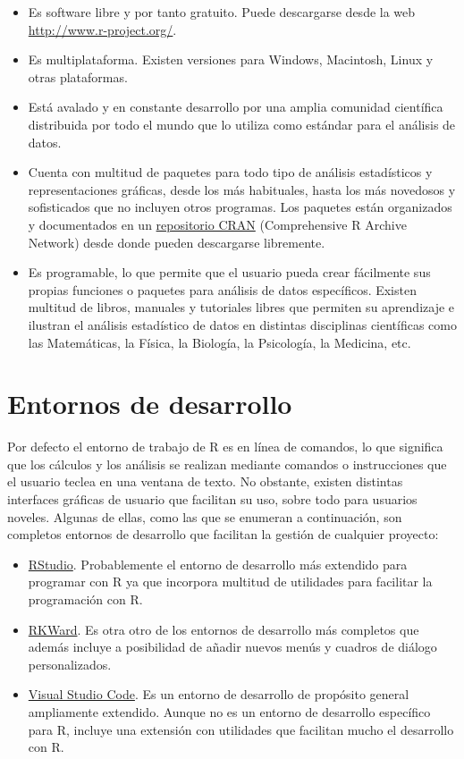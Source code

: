 \documentclass[
]{book}
\providecommand{\tightlist}{%
  \setlength{\itemsep}{0pt}\setlength{\parskip}{0pt}}
\theoremstyle{definition}
\theoremstyle{definition}
\theoremstyle{definition}
\theoremstyle{definition}
\theoremstyle{remark}
\begin{document}
\begin{itemize}
\tightlist
\item
  Es software libre y por tanto gratuito. Puede descargarse desde la web \url{http://www.r-project.org/}.
\item
  Es multiplataforma. Existen versiones para Windows, Macintosh, Linux y otras plataformas.
\item
  Está avalado y en constante desarrollo por una amplia comunidad científica distribuida por todo el mundo que lo utiliza como estándar para el análisis de datos.
\item
  Cuenta con multitud de paquetes para todo tipo de análisis estadísticos y representaciones gráficas, desde los más
  habituales, hasta los más novedosos y sofisticados que no incluyen otros programas. Los paquetes están organizados y
  documentados en un \href{https://cran.r-project.org/}{repositorio CRAN} (Comprehensive R Archive Network) desde donde pueden descargarse libremente.
\item
  Es programable, lo que permite que el usuario pueda crear fácilmente sus propias funciones o paquetes para
  análisis de datos específicos.
  Existen multitud de libros, manuales y tutoriales libres que permiten su aprendizaje e ilustran el análisis
  estadístico de datos en distintas disciplinas científicas como las Matemáticas, la Física, la Biología, la Psicología, la Medicina, etc.
\end{itemize}

\hypertarget{entornos-de-desarrollo}{%
\section{Entornos de desarrollo}\label{entornos-de-desarrollo}}

Por defecto el entorno de trabajo de R es en línea de comandos, lo que significa que los cálculos y los análisis se realizan mediante comandos o instrucciones que el usuario teclea en una ventana de texto. No obstante, existen distintas
interfaces gráficas de usuario que facilitan su uso, sobre todo para usuarios noveles. Algunas de ellas, como las que se enumeran a continuación, son completos entornos de desarrollo que facilitan la gestión de cualquier proyecto:

\begin{itemize}
\tightlist
\item
  \href{https://www.rstudio.com/}{RStudio}. Probablemente el entorno de desarrollo más extendido para programar con R ya que incorpora multitud de utilidades para facilitar la programación con R.
\item
  \href{https://rkward.kde.org}{RKWard}. Es otra otro de los entornos de desarrollo más completos que además incluye a posibilidad de añadir nuevos menús y cuadros de diálogo personalizados.
\item
  \href{https://code.visualstudio.com/}{Visual Studio Code}. Es un entorno de desarrollo de propósito general ampliamente extendido. Aunque no es un entorno de desarrollo específico para R, incluye una extensión con utilidades que facilitan mucho el desarrollo con R.
\end{itemize}
\end{document}
